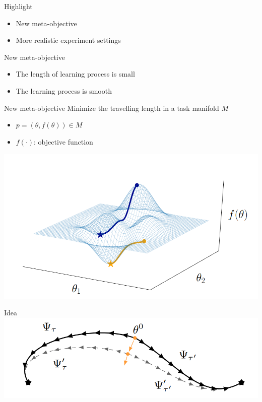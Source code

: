 \documentclass{beamer}
\begin{document}
\begin{frame}{Highlight}
  \begin{itemize}
    \item New meta-objective
    \item More realistic experiment settings
  \end{itemize}
\end{frame}

\begin{frame}{New meta-objective}
  \begin{itemize}
    \item The length of learning process is small
    \item The learning process is smooth
  \end{itemize}

\end{frame}

\begin{frame}{New meta-objective}
  Minimize the travelling length in a task manifold $M$

  \begin{itemize}
    \item $p = (\theta,f(\theta)) \in M$
    \item $f(\cdot)$: objective function
  \end{itemize}
  \center \includegraphics[width=0.7 \textwidth]{fig/p1-manifold.png}
\end{frame}

\begin{frame}{Idea}
\center \includegraphics[width = \textwidth]{fig/p1-idea.png}
\end{frame}
\end{document}
